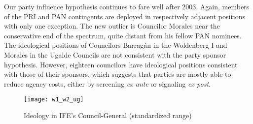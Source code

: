 \documentclass[12 pt, letter]{article}
\renewcommand{\footnote}{\endnote}
\begin{document}

Our party influence hypothesis continues to fare well after 2003.
Again, members of the PRI and PAN contingents are deployed in
respectively adjacent positions with only one exception.  The new
outlier is Councilor Morales near the conservative end of the
spectrum, quite distant from his fellow PAN nominees. The
ideological positions of Councilors Barrag\'an in the Woldenberg I
and Morales in the Ugalde Councils are not consistent with the party
sponsor hypothesis. However, eighteen councilors have ideological
positions consistent with those of their sponsors, which suggests
that parties are mostly able to reduce agency costs, either by
screening \emph{ex ante} or signaling \emph{ex post}.

\begin{figure}
\begin{center}
  \caption{Ideology in IFE's Council-General (standardized range)}\label{F:ideolbars}
  \texttt{[image: w1\_w2\_ug]}
\end{center}
\end{figure}
\end{document}
